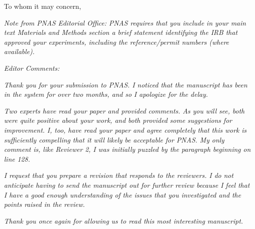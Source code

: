 \documentclass{stanfordletter}
\newcommand{\theysaid}[1]{\begin{leftbar} \noindent 
		\textsl{ #1}\end{leftbar}}
\begin{document}
	\signature{Veronica Boyce \\ Robert D. Hawkins \\ Noah D. Goodman \\ Michael C. Frank}
	
	
	\begin{letter}{}
		
		
          \opening{To whom it may concern, } 

          
           
          
         
          
          \theysaid{Note from PNAS Editorial Office: PNAS requires that you include in your main text Materials and Methods section a brief statement identifying the IRB that approved your experiments, including the reference/permit numbers (where available).}
          
          \theysaid{Editor Comments:}
          \theysaid{Thank you for your submission to PNAS. I noticed that the manuscript has been in the system for over two months, and so I apologize for the delay.}
          
          \theysaid{Two experts have read your paper and provided comments. As you will see, both were quite positive about your work, and both provided some suggestions for improvement. I, too, have read your paper and agree completely that this work is sufficiently compelling that it will likely be acceptable for PNAS. My only comment is, like Reviewer 2, I was initially puzzled by the paragraph beginning on line 128.}

          
          \theysaid{I request that you prepare a revision that responds to the reviewers. I do not anticipate having to send the manuscript out for further review because I feel that I have a good enough understanding of the issues that you investigated and the points raised in the review.}
          
          \theysaid{Thank you once again for allowing us to read this most interesting manuscript.}
          

\end{letter}
\end{document}
